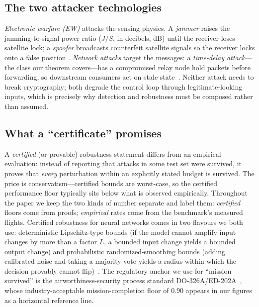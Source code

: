 \documentclass[conference]{IEEEtran}
\begin{document}
\subsection{The two attacker technologies}
\emph{Electronic warfare (EW)} attacks the sensing physics. A \emph{jammer}
raises the jamming-to-signal power ratio ($J/S$, in decibels, dB) until the
receiver loses satellite lock; a \emph{spoofer} broadcasts counterfeit
satellite signals so the receiver locks onto a false position
\cite{humphreys2008assessing,kerns2014capture}. \emph{Network attacks} target
the messages: a \emph{time-delay attack}---the class our theorem covers---has a
compromised relay node hold packets before forwarding, so downstream
consumers act on stale state~\cite{lou2019timedelay,datamut2026}. Neither
attack needs to break cryptography; both degrade the control loop through
legitimate-looking inputs, which is precisely why detection and robustness
must be composed rather than assumed.

\subsection{What a ``certificate'' promises}
A \emph{certified} (or provable) robustness statement differs from an
empirical evaluation: instead of reporting that attacks in some test set were
survived, it proves that \emph{every} perturbation within an explicitly stated
budget is survived. The price is conservatism---certified bounds are
worst-case, so the certified performance floor typically sits below what is
observed empirically. Throughout the paper we keep the two kinds of number
separate and label them: \emph{certified} floors come from proofs;
\emph{empirical} rates come from the benchmark's measured flights. Certified
robustness for neural networks comes in two flavours we both use:
deterministic Lipschitz-type bounds (if the model cannot amplify input changes
by more than a factor $L$, a bounded input change yields a bounded output
change) and probabilistic randomized-smoothing bounds (adding calibrated noise
and taking a majority vote yields a radius within which the decision provably
cannot flip)~\cite{cohen2019smoothing}. The regulatory anchor we use for
``mission survived'' is the airworthiness-security process standard
DO-326A/ED-202A~\cite{do326a}, whose industry-acceptable mission-completion
floor of $0.90$ appears in our figures as a horizontal reference line.
\end{document}
